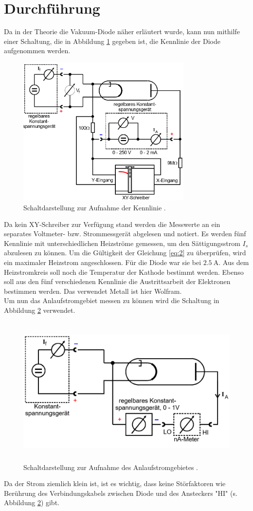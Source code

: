 \section{Durchführung}
Da in der Theorie die Vakuum-Diode näher erläutert wurde, kann nun mithilfe
einer Schaltung, die in Abbildung \ref{abb:4} gegeben ist, die Kennlinie
der Diode aufgenommen werden.
\begin{figure}[H]
  \centering
  \includegraphics[width=10 cm, height= 7.5cm]{content/Aufbau1.png}
  \caption{Schaltdarstellung zur Aufnahme der Kennlinie \cite{1}.}
  \label{abb:4}
\end{figure}
Da kein XY-Schreiber zur Verfügung stand werden die Messwerte an ein separates Voltmeter-
bzw. Strommessgerät abgelesen und notiert.
Es werden fünf Kennlinie mit unterschiedlichen Heizströme gemessen, um den Sättigungsstrom
$I_s$ abzulesen zu können.
Um die Gültigkeit der Gleichung \ref{eq:2} zu überprüfen, wird ein maximaler Heizstrom
angeschlossen. Für die Diode war sie bei $\SI{2.5}{\ampere}$.
Aus dem Heizstromkreis soll noch die Temperatur der Kathode bestimmt werden.
Ebenso soll aus den fünf verschiedenen Kennlinie die Austrittsarbeit der Elektronen bestimmen werden.
Das verwendet Metall ist hier Wolfram.\\
Um nun das Anlaufstromgebiet messen zu können wird die Schaltung in Abbildung \ref{abb:5}
verwendet.
\begin{figure}[H]
  \centering
  \includegraphics[width=10 cm, height= 7.5cm]{content/Aufbau2.png}
  \caption{Schaltdarstellung zur Aufnahme des Anlaufstromgebietes \cite{1}.}
  \label{abb:5}
\end{figure}
Da der Strom ziemlich klein ist, ist es wichtig, dass keine Störfaktoren wie Berührung des
Verbindungskabels zwischen Diode und des Ansteckers "HI" (s. Abbildung \ref{abb:5})
gibt.
